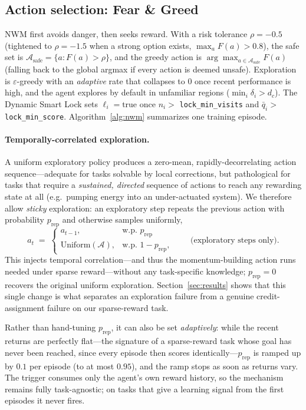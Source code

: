 \documentclass[11pt]{article}
\newcommand{\Fforce}{F}
\newcommand{\NWM}{\textsc{NWM}}
\begin{document}
\subsection{Action selection: Fear \& Greed}
\NWM{} first avoids danger, then seeks reward. With a risk tolerance
$\rho=-0.5$ (tightened to $\rho=-1.5$ when a strong option exists,
$\max_a \Fforce(a)>0.8$), the safe set is
$\mathcal{A}_{\text{safe}}=\{a:\Fforce(a)>\rho\}$, and the greedy action is
$\arg\max_{a\in\mathcal{A}_{\text{safe}}}\Fforce(a)$ (falling back to the global
argmax if every action is deemed unsafe). Exploration is $\varepsilon$-greedy
with an \emph{adaptive} rate that collapses to $0$ once recent performance is
high, and the agent explores by default in unfamiliar regions
($\min_i\delta_i>d_c$). The Dynamic Smart Lock sets $\ell_i\!=\!\text{true}$
once $n_i>$ \texttt{lock\_min\_visits} and $\bar q_i>$ \texttt{lock\_min\_score}.
Algorithm~\ref{alg:nwm} summarizes one training episode.

\paragraph{Temporally-correlated exploration.} A uniform exploratory policy
produces a zero-mean, rapidly-decorrelating action sequence---adequate for tasks
solvable by local corrections, but pathological for tasks that require a
\emph{sustained, directed} sequence of actions to reach any rewarding state at
all (e.g.\ pumping energy into an under-actuated system). We therefore allow
\emph{sticky} exploration: an exploratory step repeats the previous action with
probability $p_{\text{rep}}$ and otherwise samples uniformly,
\begin{equation}
a_t \;=\;
\begin{cases}
a_{t-1}, & \text{w.p. } p_{\text{rep}}\\[2pt]
\mathrm{Uniform}(\mathcal{A}), & \text{w.p. } 1-p_{\text{rep}},
\end{cases}
\qquad\text{(exploratory steps only).}
\end{equation}
This injects temporal correlation---and thus the momentum-building action runs
needed under sparse reward---without any task-specific knowledge; $p_{\text{rep}}
{=}0$ recovers the original uniform exploration. Section~\ref{sec:results} shows
that this single change is what separates an exploration failure from a genuine
credit-assignment failure on our sparse-reward task.

Rather than hand-tuning $p_{\text{rep}}$, it can also be set \emph{adaptively}:
while the recent returns are perfectly flat---the signature of a sparse-reward
task whose goal has never been reached, since every episode then scores
identically---$p_{\text{rep}}$ is ramped up by $0.1$ per episode (to at most
$0.95$), and the ramp stops as soon as returns vary. The trigger consumes only
the agent's own reward history, so the mechanism remains fully task-agnostic;
on tasks that give a learning signal from the first episodes it never fires.
\end{document}

